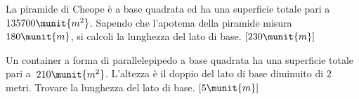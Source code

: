 \begin{htmulticols}{2}
\begin{esercizio}
 \label{ese:3.149}
La piramide di Cheope è a base quadrata ed ha una superficie totale pari a
\( 135700\munit{m^2}\).
Sapendo che l'apotema della piramide misura~\(180\munit{m}\), 
si calcoli la lunghezza del lato di base.
\hfill\(\left[230\munit{m}\right]\)
\end{esercizio}

\begin{esercizio}
 \label{ese:3.150}
Un container a forma di parallelepipedo a base quadrata ha una superficie
totale pari a~\(210\munit{m^2}\). L'altezza è il doppio del lato di base 
diminuito di \(2\) metri. Trovare la lunghezza del lato di base.
\hfill\(\left[5\munit{m}\right]\)
\end{esercizio}

\begin{comment}

\subsection*{3.10 - Problemi con un parametro}

\begin{esercizio}
 \label{ese:3.151}
Sul prolungamento dei lati~\(AB\),~\(BC\),~\(CD\),~\(DA\) del 
quadrato~\(ABCD\) 
prendi rispettivamente i punti\( Q\),\( R\),\( S\),~\(P\) in modo che\( 
QB=RC=SD=PA~\)Dimostra che~\(PQRS\) è un quadrato;~ nell'ipotesi che 
sia\(AB 
= 
3\munit{m}\) determina\(\overline {AP}\) in modo che l'area di~\(PQRS\) 
sia\( 
k\), 
con\( k\) reale positivo.
\begin{center}
 
\end{center}
\emph{Svolgimento}:
per dimostrare che~\(PQRS\) è un quadrato dobbiamo dimostrare che i lati 
sono
congruenti e che gli angoli sono retti. Se si pone\(\overline{AP} = x\) 
con\(x > 
0\)
\(\area{PQRS}= \overline {PQ}^{2} = \overline {PA}^{2} + 
\overline{AQ}^{2}\)per il 
teorema di Pitagora.
Verifica che si ottiene l'equazione risolvente\(2 x^{2} + 6 x + (9-k) = 
0\) 
Poiché vogliamo soluzioni reali positive, discuti l'equazione con il 
metodo di 
Cartesio. Il discriminante è\(\Delta = 36-8 (9-k)\) pertanto l'equazione 
ammette 
soluzioni reali per\(k \geq \dfrac{9}{2}~\)Dal segno dei coefficienti, 
essendo i 
primi due coefficienti positivi si ha una permanenza e quindi una radice 
negativa che non è accettabile. Per ottenere una soluzione positiva ci 
deve 
essere una variazione di segno negli ultimi due coefficienti, in altre 
parole 
\(9-k\) deve essere negativo cioè\(9-k < 0 \rightarrow k > 9~\)Pertanto 
il 
problema 
ha soluzioni per\(k > 9\)
\end{esercizio}


\end{comment}
\end{htmulticols}
